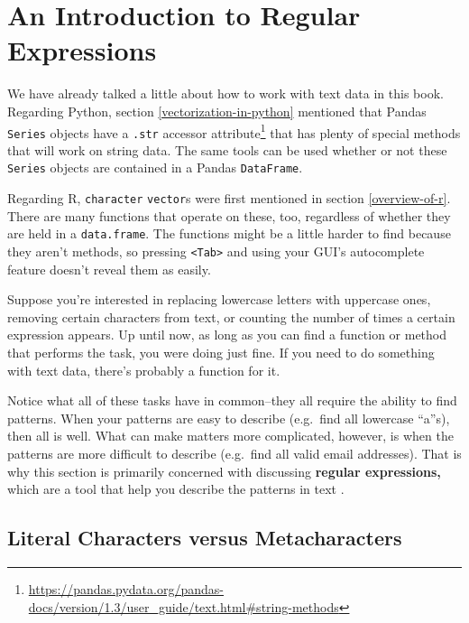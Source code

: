 \documentclass[12pt,krantz2]{krantz}
\renewcommand{\href}[2]{#2\footnote{\url{#1}}}
\begin{document}
\hypertarget{an-introduction-to-regular-expressions}{%
\section{An Introduction to Regular Expressions}\label{an-introduction-to-regular-expressions}}

We have already talked a little about how to work with text data in this book. Regarding Python, section \ref{vectorization-in-python} mentioned that Pandas \texttt{Series} objects have a \href{https://pandas.pydata.org/pandas-docs/version/1.3/user_guide/text.html\#string-methods}{\texttt{.str} accessor attribute} that has plenty of special methods that will work on string data. The same tools can be used whether or not these \texttt{Series} objects are contained in a Pandas \texttt{DataFrame}.

Regarding R, \texttt{character} \texttt{vector}s were first mentioned in section \ref{overview-of-r}. There are many functions that operate on these, too, regardless of whether they are held in a \texttt{data.frame}. The functions might be a little harder to find because they aren't methods, so pressing \texttt{\textless{}Tab\textgreater{}} and using your GUI's autocomplete feature doesn't reveal them as easily.

Suppose you're interested in replacing lowercase letters with uppercase ones, removing certain characters from text, or counting the number of times a certain expression appears. Up until now, as long as you can find a function or method that performs the task, you were doing just fine. If you need to do something with text data, there's probably a function for it.

Notice what all of these tasks have in common--they all require the ability to find patterns. When your patterns are easy to describe (e.g.~find all lowercase ``a''s), then all is well. What can make matters more complicated, however, is when the patterns are more difficult to describe (e.g.~find all valid email addresses). That is why this section is primarily concerned with discussing \textbf{regular expressions,} which are a tool that help you describe the patterns in text \citep{rfords} \citep{pythonregexprs}.

\hypertarget{literal-characters-versus-metacharacters}{%
\subsection{Literal Characters versus Metacharacters}\label{literal-characters-versus-metacharacters}}
\end{document}
